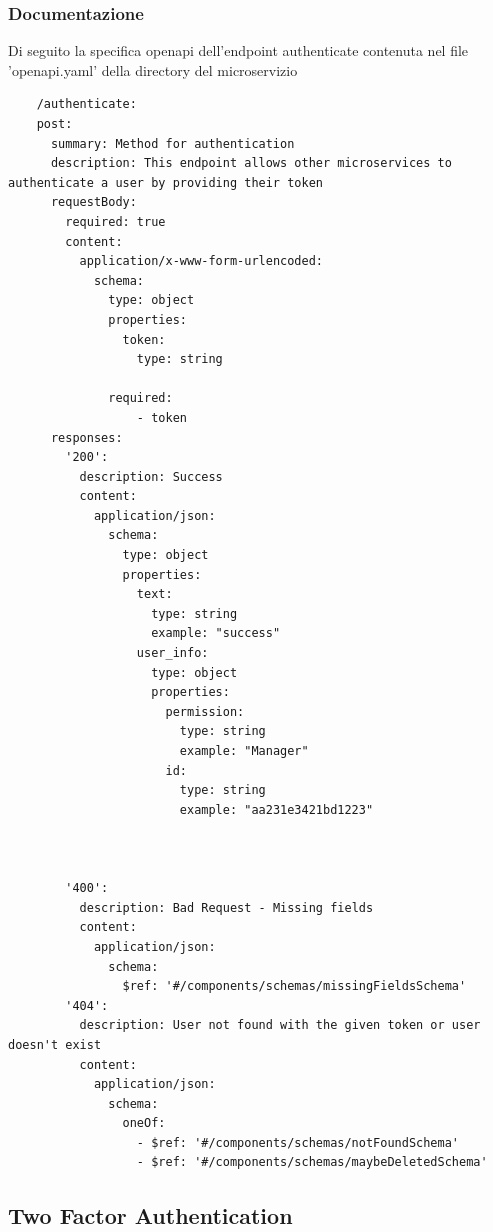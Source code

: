 \documentclass{report}
\begin{document}
\subsubsection*{Documentazione}
Di seguito la specifica openapi dell'endpoint authenticate contenuta nel file 'openapi.yaml' della directory del microservizio
\begin{verbatim}
	/authenticate:
    post:
      summary: Method for authentication 
      description: This endpoint allows other microservices to authenticate a user by providing their token
      requestBody:
        required: true
        content:
          application/x-www-form-urlencoded:
            schema:
              type: object
              properties:
                token:
                  type: string
                  
              required:
                  - token
      responses:
        '200':
          description: Success
          content:
            application/json:
              schema:
                type: object
                properties:
                  text:
                    type: string
                    example: "success"
                  user_info:
                    type: object
                    properties:
                      permission:
                        type: string
                        example: "Manager"
                      id:
                        type: string
                        example: "aa231e3421bd1223"

      

        '400':
          description: Bad Request - Missing fields 
          content:
            application/json:
              schema:
                $ref: '#/components/schemas/missingFieldsSchema'
        '404':
          description: User not found with the given token or user doesn't exist 
          content:
            application/json:
              schema:
                oneOf:
                  - $ref: '#/components/schemas/notFoundSchema'
                  - $ref: '#/components/schemas/maybeDeletedSchema'

\end{verbatim}

\subsection{Two Factor Authentication}
\end{document}

